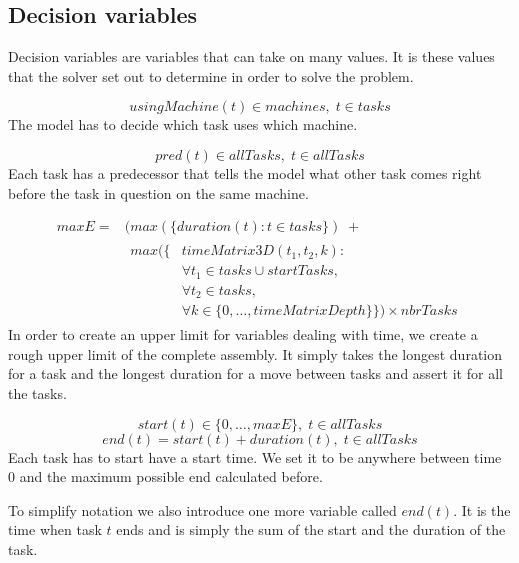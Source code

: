  
 \subsection{Decision variables}
 Decision variables are variables that can take on many values. It is these values that the solver set out to determine in order to solve the problem.
 
 \begin{equation}\label{eq:40}
 usingMachine(t) \in machines, \; t \in tasks
 \end{equation}
 The model has to decide which task uses which machine.
 
 \begin{equation}\label{eq:41}
 pred(t) \in allTasks, \; t \in allTasks
 \end{equation}
Each task has a predecessor that tells the model what other task comes right before the task in question on the same machine.
 
 \begin{equation}
 \begin{aligned}\label{eq:maxE}
 maxE = &(max(\{duration(t) : t \in tasks\}) \; +  \\ 
 &\begin{aligned}
 max(\{&timeMatrix3D(t_1,t_2,k) : \\
 &\forall t_1 \in tasks \cup startTasks,  \\ 
 &\forall t_2 \in tasks,\\
 &\forall k \in \{0 , \ldots , timeMatrixDepth\}\}) \times nbrTasks
  \end{aligned}
 \end{aligned}
 \end{equation}
 In order to create an upper limit for variables dealing with time, we create a rough upper limit of the complete assembly. It simply takes the longest duration for a task and the longest duration for a move between tasks and assert it for all the tasks.
 
 \begin{equation}\label{eq:46}
 start(t) \in \{0 , \ldots , maxE\}, \; t \in allTasks
 \end{equation} 
 \begin{equation}\label{eq:47}
 end(t) = start(t) + duration(t), \; t \in allTasks
 \end{equation}
Each task has to start have a start time. We set it to be anywhere between time $0$ and the maximum possible end calculated before.

To simplify notation we also introduce one more variable called $end(t)$. It is the time when task $t$ ends and is simply the sum of the start and the duration of the task.

